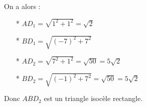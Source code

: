 On a alors : 
\\
\begin{itemize}
\item [*] $ AD_1 = \sqrt{1^2 + 1^2} = \sqrt{2} $\\
\item [*] $ BD_1 = \sqrt{\left(-7\right)^2 + 7^2} $\\
\item [*] $ AD_2 = \sqrt{7^2 + 1^2} = \sqrt{50} = 5\sqrt{2} $\\
\item [*] $ BD_2 = \sqrt{\left(-1\right)^2 + 7^2} = \sqrt{50} = 5\sqrt{2} $\\
\end{itemize}

Donc $ABD_2$ est un triangle isocèle rectangle.


\ifdefined\COMPLETE
\else
    
\fi
